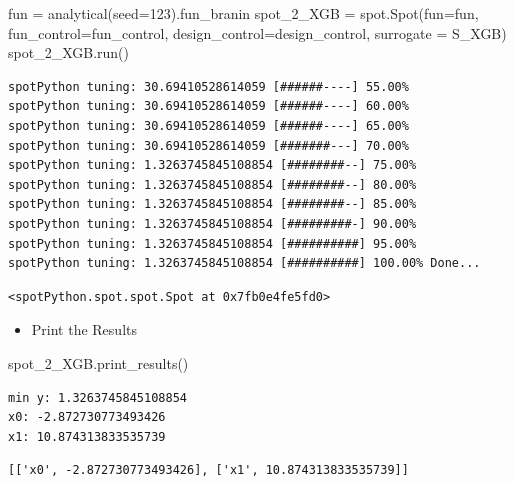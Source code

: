 \documentclass[
  letterpaper,
  DIV=11,
  numbers=noendperiod]{scrreprt}
\newenvironment{Shaded}{\begin{snugshade}}{\end{snugshade}}
\newcommand{\DecValTok}[1]{\textcolor[rgb]{0.68,0.00,0.00}{#1}}
\newcommand{\NormalTok}[1]{\textcolor[rgb]{0.00,0.23,0.31}{#1}}
\newcommand{\OperatorTok}[1]{\textcolor[rgb]{0.37,0.37,0.37}{#1}}
\providecommand{\tightlist}{%
  \setlength{\itemsep}{0pt}\setlength{\parskip}{0pt}}\usepackage{longtable,booktabs,array}
\begin{document}
\begin{Shaded}
\begin{Highlighting}[]
\NormalTok{fun }\OperatorTok{=}\NormalTok{ analytical(seed}\OperatorTok{=}\DecValTok{123}\NormalTok{).fun\_branin}
\NormalTok{spot\_2\_XGB }\OperatorTok{=}\NormalTok{ spot.Spot(fun}\OperatorTok{=}\NormalTok{fun,}
\NormalTok{                     fun\_control}\OperatorTok{=}\NormalTok{fun\_control,}
\NormalTok{                     design\_control}\OperatorTok{=}\NormalTok{design\_control,}
\NormalTok{                     surrogate }\OperatorTok{=}\NormalTok{ S\_XGB)}
\NormalTok{spot\_2\_XGB.run()}
\end{Highlighting}
\end{Shaded}

\begin{verbatim}
spotPython tuning: 30.69410528614059 [######----] 55.00% 
spotPython tuning: 30.69410528614059 [######----] 60.00% 
spotPython tuning: 30.69410528614059 [######----] 65.00% 
spotPython tuning: 30.69410528614059 [#######---] 70.00% 
spotPython tuning: 1.3263745845108854 [########--] 75.00% 
spotPython tuning: 1.3263745845108854 [########--] 80.00% 
spotPython tuning: 1.3263745845108854 [########--] 85.00% 
spotPython tuning: 1.3263745845108854 [#########-] 90.00% 
spotPython tuning: 1.3263745845108854 [##########] 95.00% 
spotPython tuning: 1.3263745845108854 [##########] 100.00% Done...
\end{verbatim}

\begin{verbatim}
<spotPython.spot.spot.Spot at 0x7fb0e4fe5fd0>
\end{verbatim}

\begin{itemize}
\tightlist
\item
  Print the Results
\end{itemize}

\begin{Shaded}
\begin{Highlighting}[]
\NormalTok{spot\_2\_XGB.print\_results()}
\end{Highlighting}
\end{Shaded}

\begin{verbatim}
min y: 1.3263745845108854
x0: -2.872730773493426
x1: 10.874313833535739
\end{verbatim}

\begin{verbatim}
[['x0', -2.872730773493426], ['x1', 10.874313833535739]]
\end{verbatim}
\end{document}
